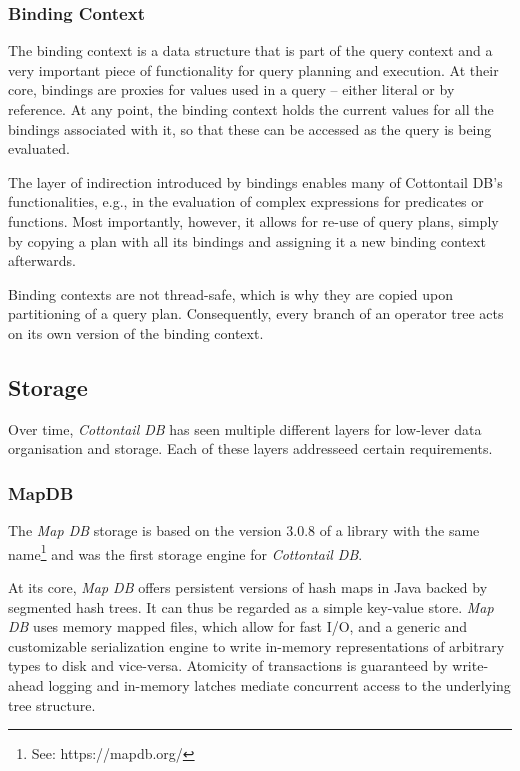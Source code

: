 \subsubsection{Binding Context}
The binding context is a data structure that is part of the query context and a very important piece of functionality for query planning and execution. At their core, bindings are proxies for values used in a query -- either literal or by reference. At any point, the binding context holds the current values for all the bindings associated with it, so that these can be accessed as the query is being evaluated.

The layer of indirection introduced by bindings enables many of Cottontail DB's functionalities, e.g., in the evaluation of complex expressions for predicates or functions. Most importantly, however, it allows for re-use of query plans, simply by copying a plan with all its bindings and assigning it a new binding context afterwards. 

Binding contexts are not thread-safe, which is why they are copied upon partitioning of a query plan. Consequently, every branch of an operator tree acts on its own version of the binding context.

\subsection{Storage}
Over time, \emph{Cottontail DB} has seen multiple different layers for low-lever data organisation and storage. Each of these layers addresseed certain requirements.

\subsubsection{MapDB}

The \emph{Map DB} storage is based on the version $3.0.8$ of a library with the same name\footnote{See: https://mapdb.org/} and was the first storage engine for \emph{Cottontail DB}.

At its core, \emph{Map DB} offers persistent versions of hash maps in Java backed by segmented hash trees. It can thus be regarded as a simple key-value store. \emph{Map DB} uses memory mapped files, which allow for fast I/O, and a generic and customizable serialization engine to write in-memory representations of arbitrary types to disk and vice-versa. Atomicity of transactions is guaranteed by write-ahead logging and in-memory latches mediate concurrent access to the underlying tree structure.

